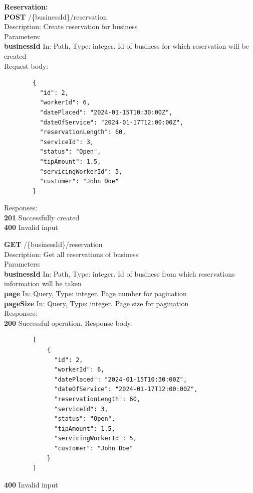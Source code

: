\documentclass[11pt,a4paper,pdftex]{article}
\begin{document}
\textbf{Reservation:}\\
\hspace*{1em}\textbf{POST} /\{businessId\}/reservation\\
\hspace*{2em}Description: Create reservation for business\\
\hspace*{2em}Parameters:\\
\hspace*{3em}\textbf{businessId} In: Path, Type: integer. Id of business for which reservation will be created\\
\hspace*{2em}Request body:
\begin{verbatim}
        {
          "id": 2,
          "workerId": 6,
          "datePlaced": "2024-01-15T10:30:00Z",
          "dateOfService": "2024-01-17T12:00:00Z",
          "reservationLength": 60,
          "serviceId": 3,
          "status": "Open",
          "tipAmount": 1.5,
          "servicingWorkerId": 5,
          "customer": "John Doe"
        }
\end{verbatim}
\hspace*{2em}Responses:\\
\hspace*{3em}\textbf{201} Successfully created\\
\hspace*{3em}\textbf{400} Invalid input

\hspace*{1em}\textbf{GET} /\{businessId\}/reservation\\
\hspace*{2em}Description: Get all reservations of business\\
\hspace*{2em}Parameters:\\
\hspace*{3em}\textbf{businessId} In: Path, Type: integer. Id of business from which reservations information will be taken\\
\hspace*{3em}\textbf{page} In: Query, Type: integer. Page number for pagination\\
\hspace*{3em}\textbf{pageSize} In: Query, Type: integer. Page size for pagination\\
\hspace*{2em}Responses:\\
\hspace*{3em}\textbf{200} Successful operation. Response body:
\begin{verbatim}
        [
            {
              "id": 2,
              "workerId": 6,
              "datePlaced": "2024-01-15T10:30:00Z",
              "dateOfService": "2024-01-17T12:00:00Z",
              "reservationLength": 60,
              "serviceId": 3,
              "status": "Open",
              "tipAmount": 1.5,
              "servicingWorkerId": 5,
              "customer": "John Doe"
            }
        ]
\end{verbatim}
\hspace*{3em}\textbf{400} Invalid input
\end{document}
